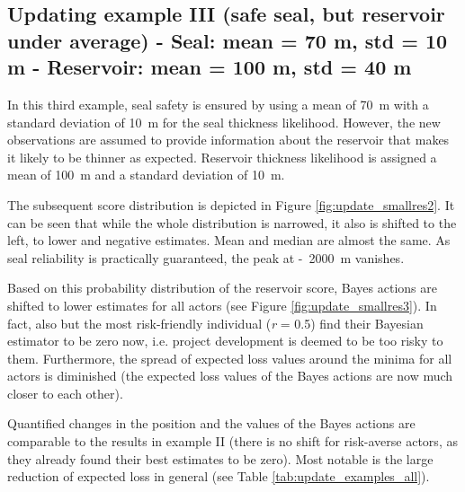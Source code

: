	
	\subsection{Updating example III (safe seal, but reservoir under average) - Seal: mean = 70 m, std = 10 m - Reservoir: mean = 100 m, std = 40 m}
	
	In this third example, seal safety is ensured by using a mean of 70~m with a standard deviation of 10~m for the seal thickness likelihood. However, the new observations are assumed to provide information about the reservoir that makes it likely to be thinner as expected. Reservoir thickness likelihood is assigned a mean of 100~m and a standard deviation of 10~m. 
	
	The subsequent score distribution is depicted in Figure \ref{fig:update_smallres2}. It can be seen that while the whole distribution is narrowed, it also is shifted to the left, to lower and negative estimates. Mean and median are almost the same. As seal reliability is practically guaranteed, the peak at -~2000~m vanishes. 
	
	Based on this probability distribution of the reservoir score, Bayes actions are shifted to lower estimates for all actors (see Figure \ref{fig:update_smallres3}). In fact, also but the most risk-friendly individual (\textit{r} = 0.5) find their Bayesian estimator to be zero now, i.e. project development is deemed to be too risky to them. Furthermore, the spread of expected loss values around the minima for all actors is diminished (the expected loss values of the Bayes actions are now much closer to each other).
	
	Quantified changes in the position and the values of the Bayes actions are comparable to the results in example II (there is no shift for risk-averse actors, as they already found their best estimates to be zero). Most notable is the large reduction of expected loss in general (see Table \ref{tab:update_examples_all}).	
	
